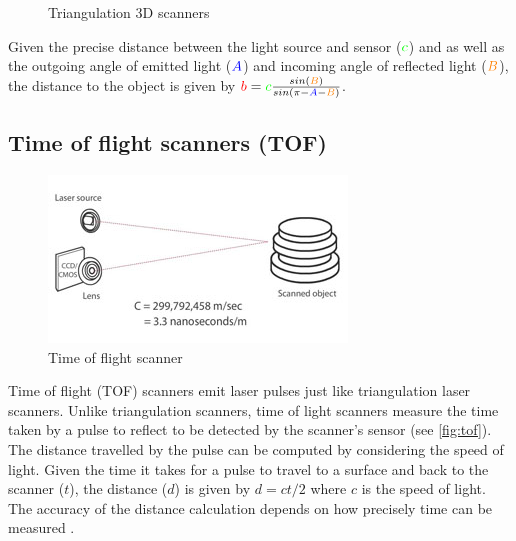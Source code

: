 \begin{figure}[H]
\begin{subfigure}[b]{.33\textwidth}
		\caption{}
	\end{subfigure}
	\caption{Triangulation 3D scanners \protect\footnotemark}
	\label{fig:triangulation-scanners}
\end{figure}

Given the precise distance between the light source and sensor ($\begingroup\color{green}c\endgroup$) and as well as the outgoing angle of emitted light ($\begingroup\color{blue}A\endgroup$) and incoming angle of reflected light ($\begingroup\color{orange}B\endgroup$), the distance to the object is given by $\begingroup\color{red}b\endgroup = \begingroup\color{green}c\endgroup\frac{ sin(\begingroup\color{orange}B\endgroup)}{sin(\pi - \begingroup\color{blue}A\endgroup-\begingroup\color{orange}B\endgroup)}$.

\subsection{Time of flight scanners (TOF)} \label{subsec:tof}

\begin{figure}[ht]
  \centreing
  \includegraphics[width=.5\linewidth]{images/pulse-tof}
  \caption[Time of flight scanner]{Time of flight scanner \protect\footnotemark[\value{footnote}]}
  \label{fig:tof}
\end{figure}

Time of flight (TOF) scanners emit laser pulses just like triangulation laser scanners. Unlike triangulation scanners, time of light scanners measure the time taken by a pulse to reflect to be detected by the scanner's sensor (see \autoref{fig:tof}). The distance travelled by the pulse can be computed by considering the speed of light. Given the time it takes for a pulse to travel to a surface and back to the scanner ($t$), the distance ($d$) is given by $d = ct/2$ where $c$ is the speed of light. The accuracy of the distance calculation depends on how precisely time can be measured \cite{Form2014}.

